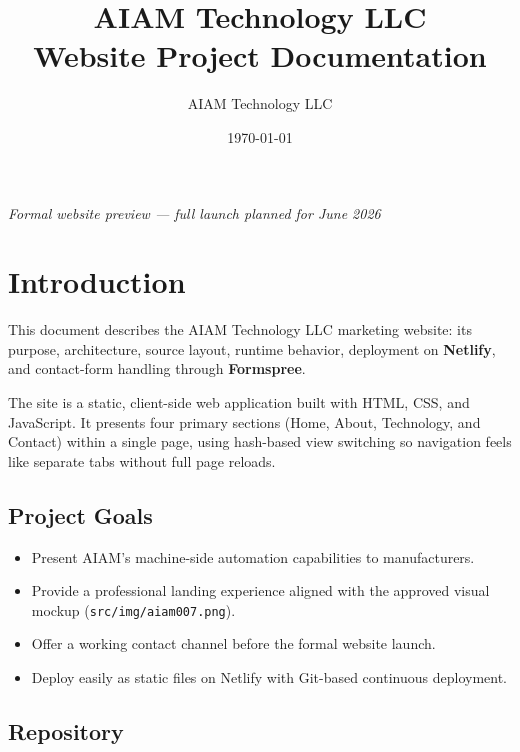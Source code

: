 \documentclass[11pt,a4paper]{article}
\title{\textbf{AIAM Technology LLC}\\[0.4em]
\large Website Project Documentation}
\author{AIAM Technology LLC}
\date{\today}
\begin{document}
\maketitle
\thispagestyle{empty}
\vfill
\begin{center}
\textit{Formal website preview --- full launch planned for June 2026}
\end{center}
\newpage

\tableofcontents
\newpage

\section{Introduction}

This document describes the AIAM Technology LLC marketing website: its purpose,
architecture, source layout, runtime behavior, deployment on \textbf{Netlify},
and contact-form handling through \textbf{Formspree}.

The site is a static, client-side web application built with HTML, CSS, and
JavaScript. It presents four primary sections (Home, About, Technology, and
Contact) within a single page, using hash-based view switching so navigation
feels like separate tabs without full page reloads.

\subsection{Project Goals}

\begin{itemize}[noitemsep]
  \item Present AIAM's machine-side automation capabilities to manufacturers.
  \item Provide a professional landing experience aligned with the approved
        visual mockup (\texttt{src/img/aiam007.png}).
  \item Offer a working contact channel before the formal website launch.
  \item Deploy easily as static files on Netlify with Git-based continuous
        deployment.
\end{itemize}

\subsection{Repository}
\end{document}
